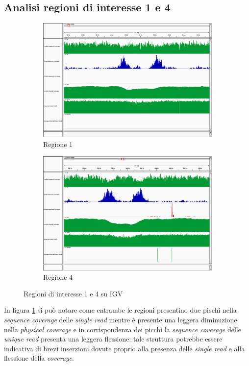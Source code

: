 \subsection{Analisi regioni di interesse 1 e 4}
\begin{figure}[htbp]
	\centering
	\begin{subfigure}[b]{.45\textwidth}
		\includegraphics[width=\textwidth]{immagini/igv_regione1.png}
		\caption{Regione 1}
	\end{subfigure}
	\quad
	\begin{subfigure}[b]{.45\textwidth}
		\includegraphics[width=\textwidth]{immagini/igv_regione4.png}
		\caption{Regione 4}
	\end{subfigure}
\caption{Regioni di interesse 1 e 4 su IGV}
\label{fig:regioni 1 e 4}
\end{figure}

In figura \ref{fig:regioni 1 e 4} si può notare come entrambe le regioni presentino due picchi nella \emph{sequence coverage} delle \emph{single read} mentre è presente una leggera diminuzione nella \emph{physical coverage} e in corrispondenza dei picchi la \emph{sequence coverage} delle \emph{unique read} presenta una leggera flessione: tale struttura potrebbe essere indicativa di brevi inserzioni dovute proprio alla presenza delle \emph{single read} e alla flessione della \emph{coverage}.

